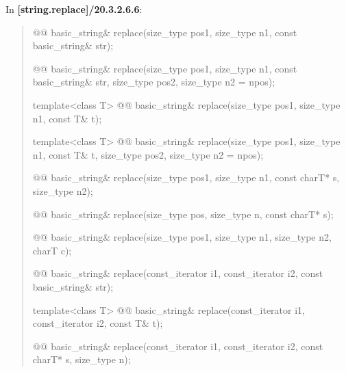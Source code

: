 \documentclass{wg21}
\begin{document}
In \textbf{[string.replace]/20.3.2.6.6}:
\begin{quote}
\begin{itemdecl}
@@ basic_string& replace(size_type pos1, size_type n1, const basic_string& str);
\end{itemdecl}

\begin{itemdecl}
@@ basic_string& replace(size_type pos1, size_type n1, const basic_string& str,
                                          size_type pos2, size_type n2 = npos);
\end{itemdecl}

\begin{itemdecl}
template<class T>
  @@ basic_string& replace(size_type pos1, size_type n1, const T& t);
\end{itemdecl}

\begin{itemdecl}
template<class T>
  @@ basic_string& replace(size_type pos1, size_type n1, const T& t,
                                            size_type pos2, size_type n2 = npos);
\end{itemdecl}

\begin{itemdecl}
@@ basic_string& replace(size_type pos1, size_type n1, const charT* s, size_type n2);
\end{itemdecl}

\begin{itemdecl}
@@ basic_string& replace(size_type pos, size_type n, const charT* s);
\end{itemdecl}

\begin{itemdecl}
@@ basic_string& replace(size_type pos1, size_type n1, size_type n2, charT c);
\end{itemdecl}

\begin{itemdecl}
@@ basic_string& replace(const_iterator i1, const_iterator i2, const basic_string& str);
\end{itemdecl}

\begin{itemdecl}
template<class T>
  @@ basic_string& replace(const_iterator i1, const_iterator i2, const T& t);
\end{itemdecl}

\begin{itemdecl}
@@ basic_string& replace(const_iterator i1, const_iterator i2, const charT* s, size_type n);
\end{itemdecl}


\end{quote}
\end{document}
